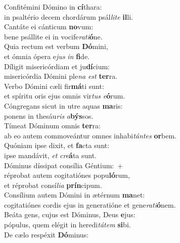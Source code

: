 \evenverse Confitémini Dómino in \textbf{cí}thara:~\*\\
\evenverse in psaltério decem chordárum psál\textit{li}\textit{te} \textbf{il}li.\\
\oddverse Cantáte ei cánticum \textbf{no}vum:~\*\\
\oddverse bene psállite ei in vocife\textit{ra}\textit{ti}\textbf{ó}ne.\\
\evenverse Quia rectum est verbum \textbf{Dó}mini,~\*\\
\evenverse et ómnia ópera e\textit{jus} \textit{in} \textbf{fi}de.\\
\oddverse Díligit misericórdiam et ju\textbf{dí}cium:~\*\\
\oddverse misericórdia Dómini ple\textit{na} \textit{est} \textbf{ter}ra.\\
\evenverse Verbo Dómini cæli fir\textbf{má}ti sunt:~\*\\
\evenverse et spíritu oris ejus omnis vir\textit{tus} \textit{e}\textbf{ó}rum.\\
\oddverse Cóngregans sicut in utre aquas \textbf{ma}ris:~\*\\
\oddverse ponens in thesáu\textit{ris} \textit{a}\textbf{býs}sos.\\
\evenverse Tímeat Dóminum omnis \textbf{ter}ra:~\*\\
\evenverse ab eo autem commoveántur omnes inhabi\textit{tán}\textit{tes} \textbf{or}bem.\\
\oddverse Quóniam ipse dixit, et \textbf{fa}cta sunt:~\*\\
\oddverse ipse mandávit, \textit{et} \textit{cre}\textbf{á}ta sunt.\\
\evenverse Dóminus díssipat consília Géntium:~+\\
\evenverse  réprobat autem cogitatiónes popu\textbf{ló}rum,~\*\\
\evenverse et réprobat consí\textit{li}\textit{a} \textbf{prín}cipum.\\
\oddverse Consílium autem Dómini in ætérnum \textbf{ma}net:~\*\\
\oddverse cogitatiónes cordis ejus in generatióne et gene\textit{ra}\textit{ti}\textbf{ó}nem.\\
\evenverse Beáta gens, cujus est Dóminus, Deus \textbf{e}jus:~\*\\
\evenverse pópulus, quem elégit in heredi\textit{tá}\textit{tem} \textbf{si}bi.\\
\oddverse De cælo respéxit \textbf{Dó}minus:~\*\\
